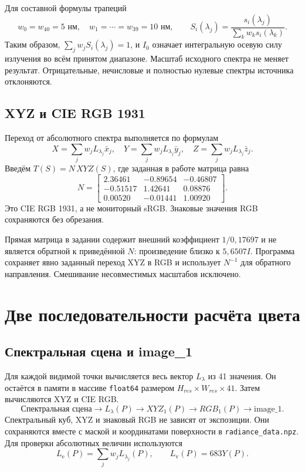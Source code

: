 \documentclass[a4paper,12pt]{article}
\newcommand{\code}[1]{\nolinkurl{#1}}
\newcommand{\Le}{L_{\mathrm e}}
\newcommand{\Lv}{L_{\mathrm v}}
\begin{document}
Для составной формулы трапеций
\[
 w_0=w_{40}=5\text{ нм},\quad w_1=\cdots=w_{39}=10\text{ нм},
 \qquad S_i(\lambda_j)=\frac{s_i(\lambda_j)}{\sum_k w_ks_i(\lambda_k)}.
\]
Таким образом, $\sum_jw_jS_i(\lambda_j)=1$, и $I_0$ означает интегральную осевую силу излучения во всём принятом диапазоне. Масштаб исходного спектра не меняет результат. Отрицательные, нечисловые и полностью нулевые спектры источника отклоняются.

\subsection{XYZ и CIE RGB 1931}
Переход от абсолютного спектра выполняется по формулам
\[
 X=\sum_jw_jL_{\lambda_j}\bar x_j,\quad
 Y=\sum_jw_jL_{\lambda_j}\bar y_j,\quad
 Z=\sum_jw_jL_{\lambda_j}\bar z_j.
\]
Введём $T(S)=N\,XYZ(S)$, где заданная в работе матрица равна
\[
 N=\begin{bmatrix}
 2.36461&-0.89654&-0.46807\\
 -0.51517&1.42641&0.08876\\
 0.00520&-0.01441&1.00920
 \end{bmatrix}.
\]
Это CIE RGB 1931, а не мониторный sRGB. Знаковые значения RGB сохраняются без обрезания.

Прямая матрица в задании содержит внешний коэффициент $1/0{,}17697$ и не является обратной к приведённой $N$: произведение близко к $5{,}6507I$. Программа сохраняет явно заданный переход XYZ в RGB и использует $N^{-1}$ для обратного направления. Смешивание несовместимых масштабов исключено.

\clearpage
\section{Две последовательности расчёта цвета}
\subsection{Спектральная сцена и image\_1}

Для каждой видимой точки вычисляется весь вектор $L_\lambda$ из 41 значения. Он остаётся в памяти в массиве \code{float64} размером $H_{res}\times W_{res}\times41$. Затем вычисляются XYZ и CIE RGB.
\[
 \text{Спектральная сцена}\longrightarrow L_\lambda(P)
 \longrightarrow XYZ_1(P)\longrightarrow RGB_1(P)
 \longrightarrow \text{image\_1}.
\]
Спектральный куб, XYZ и знаковый RGB не зависят от экспозиции. Они сохраняются вместе с маской и координатами поверхности в \code{radiance_data.npz}. Для проверки абсолютных величин используются
\[
 \Le(P)=\sum_jw_jL_{\lambda_j}(P),\qquad
 \Lv(P)=683Y(P).
\]
\end{document}
